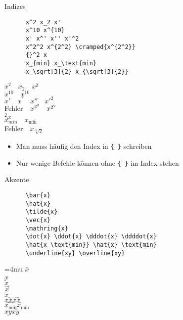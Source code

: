 \begin{frame}[fragile]{Indizes}
  \begin{CodeExample}{0.50}
    \begin{lstlisting}
      x^2 x_2 x²
      x^10 x^{10}
      x' x^' x'' x'^2
      x^2^2 x^{2^2} \cramped{x^{2^2}}
      {}^2 x
      x_{min} x_\text{min}
      x_\sqrt[3]{2} x_{\sqrt[3]{2}}
    \end{lstlisting}
  \CodeResult
    $x^2 \quad x_2 \quad x²$ \\
    $x^10 \quad x^{10}$ \\
    $x' \quad x^{'} \quad x'' \quad x'^2$ \\
    Fehler$\quad x^{2^2} \quad \cramped{x^{2^2}}$ \\
    ${}^2 x$ \\
    $x_{min} \quad x_\text{min}$ \\
    Fehler$\quad x_{\sqrt[3]{2}}$
  \end{CodeExample}
  \begin{itemize}
    \item Man muss häufig den Index in \lstinline+{ }+ schreiben
    \item Nur wenige Befehle können ohne \lstinline+{ }+ im Index stehen
  \end{itemize}
\end{frame}

\begin{frame}[fragile]{Akzente}
  \begin{CodeExample}{0.70}
    \begin{lstlisting}
      \bar{x}
      \hat{x}
      \tilde{x}
      \vec{x}
      \mathring{x}
      \dot{x} \ddot{x} \dddot{x} \ddddot{x}
      \hat{x_\text{min}} \hat{x}_\text{min}
      \underline{xy} \overline{xy}
    \end{lstlisting}
  \CodeResult
    \Umathordordspacing\textstyle=4mu
    $\bar{x}$ \\
    $\hat{x}$ \\
    $\tilde{x}$ \\
    $\vec{x}$ \\
    $\mathring{x}$ \\
    $\dot{x} \ddot{x} \dddot{x} \ddddot{x}$ \\
    $\hat{x_\text{min}} \hat{x}_\text{min}$ \\
    $\underline{xy} \overline{xy}$
  \end{CodeExample}
\end{frame}


